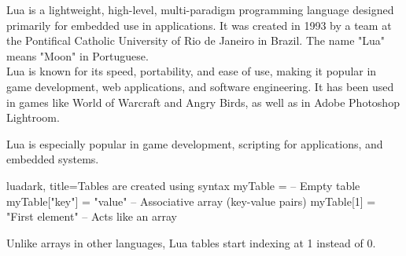 \begin{NxSBox}[][Introduction]
	\begin{NxIDBox}
		Lua is a lightweight, high-level, multi-paradigm programming language designed primarily for embedded use in applications. It was created in 1993 by a team at the Pontifical Catholic University of Rio de Janeiro in Brazil. The name "Lua" means "Moon" in Portuguese.\\[5mm]
		Lua is known for its speed, portability, and ease of use, making it popular in game development, web applications, and software engineering. It has been used in games like World of Warcraft and Angry Birds, as well as in Adobe Photoshop Lightroom.
	\end{NxIDBox}
	\begin{NxIDBoxL}[title=Key Features]
	\end{NxIDBoxL}
	\begin{NxIDBox}
		Lua is especially popular in game development, scripting for applications, and embedded systems.
	\end{NxIDBox}
\end{NxSBox}

\begin{NxSSBox}
	\begin{NxCodeBox}{lua}{dark, title=Tables are created using \nxLBracket\nxRBracket syntax}
		myTable = {} -- Empty table
		myTable["key"] = "value" -- Associative array (key-value pairs)
		myTable[1] = "First element" -- Acts like an array
	\end{NxCodeBox}
	\begin{NxIDBox}
		Unlike arrays in other languages, Lua tables start indexing at 1 instead of 0.
	\end{NxIDBox}
\end{NxSSBox}

